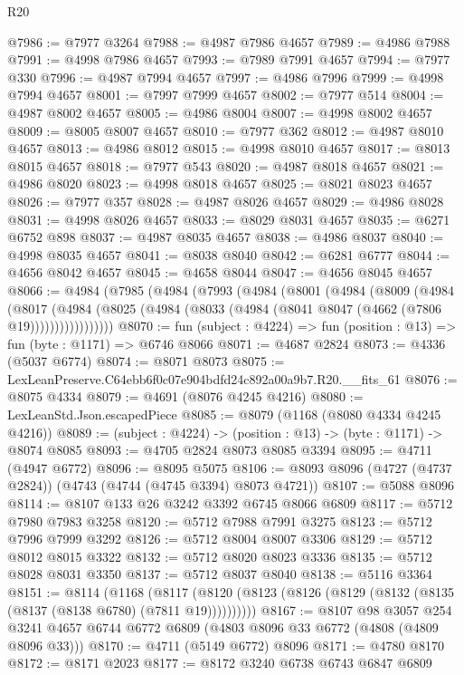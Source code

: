 \begin{lexlean}{R20}
\begin{coremodule}
@7986 := @7977 @3264
@7988 := @4987 @7986 @4657
@7989 := @4986 @7988
@7991 := @4998 @7986 @4657
@7993 := @7989 @7991 @4657
@7994 := @7977 @330
@7996 := @4987 @7994 @4657
@7997 := @4986 @7996
@7999 := @4998 @7994 @4657
@8001 := @7997 @7999 @4657
@8002 := @7977 @514
@8004 := @4987 @8002 @4657
@8005 := @4986 @8004
@8007 := @4998 @8002 @4657
@8009 := @8005 @8007 @4657
@8010 := @7977 @362
@8012 := @4987 @8010 @4657
@8013 := @4986 @8012
@8015 := @4998 @8010 @4657
@8017 := @8013 @8015 @4657
@8018 := @7977 @543
@8020 := @4987 @8018 @4657
@8021 := @4986 @8020
@8023 := @4998 @8018 @4657
@8025 := @8021 @8023 @4657
@8026 := @7977 @357
@8028 := @4987 @8026 @4657
@8029 := @4986 @8028
@8031 := @4998 @8026 @4657
@8033 := @8029 @8031 @4657
@8035 := @6271 @6752 @898
@8037 := @4987 @8035 @4657
@8038 := @4986 @8037
@8040 := @4998 @8035 @4657
@8041 := @8038 @8040
@8042 := @6281 @6777
@8044 := @4656 @8042 @4657
@8045 := @4658 @8044
@8047 := @4656 @8045 @4657
@8066 := @4984
    (@7985
      (@4984
        (@7993
          (@4984
            (@8001
              (@4984
                (@8009
                  (@4984
                    (@8017
                      (@4984
                        (@8025 (@4984 (@8033 (@4984 (@8041 @8047 (@4662 (@7806 @19)))))))))))))))))
@8070 := fun (subject : @4224) => fun (position : @13) => fun (byte : @1171) => @6746 @8066
@8071 := @4687 @2824
@8073 := @4336 (@5037 @6774)
@8074 := @8071 @8073
@8075 := LexLeanPreserve.C64ebb6f0c07e904bdfd24c892a00a9b7.R20.__fits_61
@8076 := @8075 @4334
@8079 := @4691 (@8076 @4245 @4216)
@8080 := LexLeanStd.Json.escapedPiece
@8085 := @8079 (@1168 (@8080 @4334 @4245 @4216))
@8089 := (subject : @4224) -> (position : @13) -> (byte : @1171) -> @8074 @8085
@8093 := @4705 @2824 @8073 @8085 @3394
@8095 := @4711 (@4947 @6772)
@8096 := @8095 @5075
@8106 := @8093 @8096 (@4727 (@4737 @2824)) (@4743 (@4744 (@4745 @3394) @8073 @4721))
@8107 := @5088 @8096
@8114 := @8107 @133 @26 @3242 @3392 @6745 @8066 @6809
@8117 := @5712 @7980 @7983 @3258
@8120 := @5712 @7988 @7991 @3275
@8123 := @5712 @7996 @7999 @3292
@8126 := @5712 @8004 @8007 @3306
@8129 := @5712 @8012 @8015 @3322
@8132 := @5712 @8020 @8023 @3336
@8135 := @5712 @8028 @8031 @3350
@8137 := @5712 @8037 @8040
@8138 := @5116 @3364
@8151 := @8114
    (@1168
      (@8117 (@8120 (@8123 (@8126 (@8129 (@8132 (@8135 (@8137 (@8138 @6780) (@7811 @19))))))))))
@8167 := @8107
    @98
    @3057
    @254
    @3241
    @4657
    @6744
    @6772
    @6809
    (@4803 @8096 @33 @6772 (@4808 (@4809 @8096 @33)))
@8170 := @4711 (@5149 @6772) @8096
@8171 := @4780 @8170
@8172 := @8171 @2023
@8177 := @8172 @3240 @6738 @6743 @6847 @6809

\end{coremodule}
\end{lexlean}

